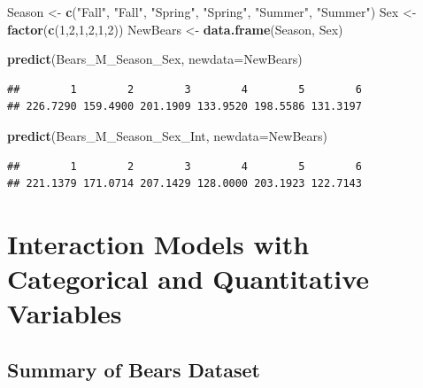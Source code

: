 \documentclass[]{book}
\newenvironment{Shaded}{\begin{snugshade}}{\end{snugshade}}
\newcommand{\KeywordTok}[1]{\textcolor[rgb]{0.13,0.29,0.53}{\textbf{#1}}}
\newcommand{\DataTypeTok}[1]{\textcolor[rgb]{0.13,0.29,0.53}{#1}}
\newcommand{\DecValTok}[1]{\textcolor[rgb]{0.00,0.00,0.81}{#1}}
\newcommand{\StringTok}[1]{\textcolor[rgb]{0.31,0.60,0.02}{#1}}
\newcommand{\NormalTok}[1]{#1}
\begin{document}
\begin{Shaded}
\begin{Highlighting}[]
\NormalTok{Season <-}\StringTok{ }\KeywordTok{c}\NormalTok{(}\StringTok{"Fall"}\NormalTok{, }\StringTok{"Fall"}\NormalTok{, }\StringTok{"Spring"}\NormalTok{, }\StringTok{"Spring"}\NormalTok{, }\StringTok{"Summer"}\NormalTok{, }\StringTok{"Summer"}\NormalTok{)}
\NormalTok{Sex <-}\StringTok{ }\KeywordTok{factor}\NormalTok{(}\KeywordTok{c}\NormalTok{(}\DecValTok{1}\NormalTok{,}\DecValTok{2}\NormalTok{,}\DecValTok{1}\NormalTok{,}\DecValTok{2}\NormalTok{,}\DecValTok{1}\NormalTok{,}\DecValTok{2}\NormalTok{))}
\NormalTok{NewBears <-}\StringTok{ }\KeywordTok{data.frame}\NormalTok{(Season, Sex)}
\end{Highlighting}
\end{Shaded}

\begin{Shaded}
\begin{Highlighting}[]
\KeywordTok{predict}\NormalTok{(Bears_M_Season_Sex, }\DataTypeTok{newdata=}\NormalTok{NewBears)}
\end{Highlighting}
\end{Shaded}

\begin{verbatim}
##        1        2        3        4        5        6 
## 226.7290 159.4900 201.1909 133.9520 198.5586 131.3197
\end{verbatim}

\begin{Shaded}
\begin{Highlighting}[]
\KeywordTok{predict}\NormalTok{(Bears_M_Season_Sex_Int, }\DataTypeTok{newdata=}\NormalTok{NewBears)}
\end{Highlighting}
\end{Shaded}

\begin{verbatim}
##        1        2        3        4        5        6 
## 221.1379 171.0714 207.1429 128.0000 203.1923 122.7143
\end{verbatim}

\section{Interaction Models with Categorical and Quantitative
Variables}\label{interaction-models-with-categorical-and-quantitative-variables}

\subsection{Summary of Bears Dataset}\label{summary-of-bears-dataset}
\end{document}
